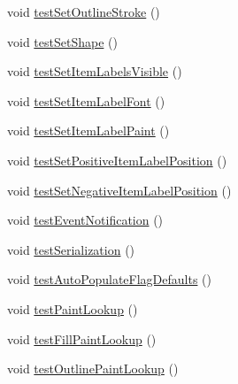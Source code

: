 \begin{DoxyCompactItemize}
\item 
void \mbox{\hyperlink{classorg_1_1jfree_1_1chart_1_1renderer_1_1_abstract_renderer_test_aad385c2d9477d2980289c5a2fa91577d}{test\+Set\+Outline\+Stroke}} ()
\item 
void \mbox{\hyperlink{classorg_1_1jfree_1_1chart_1_1renderer_1_1_abstract_renderer_test_a91390552ed26118cf00bbc5da738e6ec}{test\+Set\+Shape}} ()
\item 
void \mbox{\hyperlink{classorg_1_1jfree_1_1chart_1_1renderer_1_1_abstract_renderer_test_ae4e020b81c287b8ec6a8e1c48cb97408}{test\+Set\+Item\+Labels\+Visible}} ()
\item 
void \mbox{\hyperlink{classorg_1_1jfree_1_1chart_1_1renderer_1_1_abstract_renderer_test_ac43694480572cd0d41514180f2e29069}{test\+Set\+Item\+Label\+Font}} ()
\item 
void \mbox{\hyperlink{classorg_1_1jfree_1_1chart_1_1renderer_1_1_abstract_renderer_test_a397856d0b036672e099ceb7e23323a0a}{test\+Set\+Item\+Label\+Paint}} ()
\item 
void \mbox{\hyperlink{classorg_1_1jfree_1_1chart_1_1renderer_1_1_abstract_renderer_test_a5ed1d3f9968634c90f0637fcb420311f}{test\+Set\+Positive\+Item\+Label\+Position}} ()
\item 
void \mbox{\hyperlink{classorg_1_1jfree_1_1chart_1_1renderer_1_1_abstract_renderer_test_ad0cfaaf28d9da3a2a747f6a234b06f71}{test\+Set\+Negative\+Item\+Label\+Position}} ()
\item 
void \mbox{\hyperlink{classorg_1_1jfree_1_1chart_1_1renderer_1_1_abstract_renderer_test_a46ca87460ff28add26344ffb80479981}{test\+Event\+Notification}} ()
\item 
void \mbox{\hyperlink{classorg_1_1jfree_1_1chart_1_1renderer_1_1_abstract_renderer_test_a7ad1a8ade6f3a94a1b904fdc3062a18f}{test\+Serialization}} ()
\item 
void \mbox{\hyperlink{classorg_1_1jfree_1_1chart_1_1renderer_1_1_abstract_renderer_test_a63bc5ae091e5eb4e73d6202bdd96e977}{test\+Auto\+Populate\+Flag\+Defaults}} ()
\item 
void \mbox{\hyperlink{classorg_1_1jfree_1_1chart_1_1renderer_1_1_abstract_renderer_test_af55cea892b8e8c9a03297b1782ecb062}{test\+Paint\+Lookup}} ()
\item 
void \mbox{\hyperlink{classorg_1_1jfree_1_1chart_1_1renderer_1_1_abstract_renderer_test_a88fafbc379beec1037404b4e244acb66}{test\+Fill\+Paint\+Lookup}} ()
\item 
void \mbox{\hyperlink{classorg_1_1jfree_1_1chart_1_1renderer_1_1_abstract_renderer_test_a86944b602d66662e5bbcdba8cc081f7f}{test\+Outline\+Paint\+Lookup}} ()
\end{DoxyCompactItemize}


